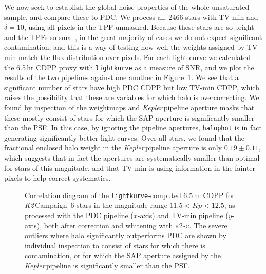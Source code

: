 \documentclass[modern]{aastex62}
\newcommand\kepler{\emph{Kepler}\,}
\newcommand\ktwo{\emph{K2}\,}
\begin{document}
\begin{figure*}
\caption{The eight transiting single-planet systems in \ktwo Campaign~6 in the magnitude range $11.5 < Kp < 12.5$, with PDC light curves (blue) and TV-min light curves (orange) overlaid. These have been identically \textsc{k2sc}-corrected, whitened, outlier-clipped, folded and binned as described in Section~\ref{sec:benchmarking}. The depths and shapes of the transits agree closely except for EPIC~212460519, for which the TV-min transit is slightly shallower, and EPIC~212555594, for which TV-min is significantly shallower.}
\label{fig:planets}
\end{figure*}

We now seek to establish the global noise properties of the whole unsaturated sample, and compare these to PDC. We process all~2466 stars with TV-min and $\delta = 10$, using all pixels in the TPF unmasked. Because these stars are so bright and the TPFs so small, in the great majority  of cases we do not expect significant contamination, and this is a way of testing how well the weights assigned by TV-min match the flux distribution over pixels. For each light curve we calculated the 6.5\,hr CDPP proxy with \texttt{lightkurve} as a measure of SNR, and we plot the results of the two pipelines against one another in Figure~\ref{fig:halovspdc}. We see that a significant number of stars have high PDC CDPP but low TV-min CDPP, which raises the possibility that these are variables for which halo is overcorrecting. We found by inspection of the weightmaps and \kepler pipeline aperture masks that these mostly consist of stars for which the SAP aperture is significantly smaller than the PSF. In this case, by ignoring the pipeline apertures, \texttt{halophot} is in fact generating significantly better light curves. Over all stars, we found that the fractional enclosed halo weight in the \kepler pipeline aperture is only $0.19 \pm 0.11$, which suggests that in fact the apertures are systematically smaller than optimal for stars of this magnitude, and that TV-min is using information in the fainter pixels to help correct systematics.

\begin{figure}
\caption{Correlation diagram of the \texttt{lightkurve}-computed 6.5\,hr CDPP for \ktwo Campaign~6 stars in the magnitude range $11.5 < Kp < 12.5$, as processed with the PDC pipeline ($x$-axis) and TV-min pipeline ($y$-axis), both after correction and whitening with \textsc{k2sc}. The severe outliers where halo significantly outperforms PDC are shown by individual inspection to consist of stars for which there is contamination, or for which the SAP aperture assigned by the \kepler pipeline is significantly smaller than the PSF.}
\label{fig:halovspdc}
\end{figure}
\end{document}
